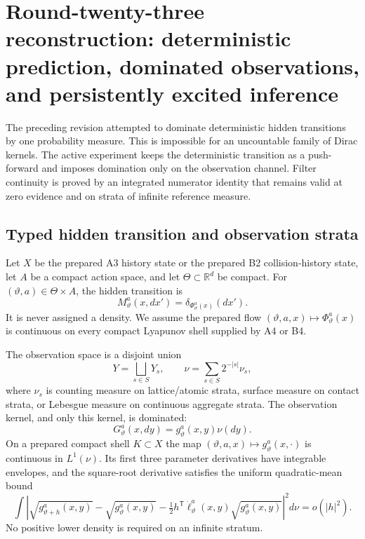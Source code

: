 \section{Round-twenty-three reconstruction: deterministic prediction, dominated observations, and persistently excited inference}
\label{sec:r23-c1}

The preceding revision attempted to dominate deterministic hidden transitions
by one probability measure.  This is impossible for an uncountable family of
Dirac kernels.  The active experiment keeps the deterministic transition as a
push-forward and imposes domination only on the observation channel.  Filter
continuity is proved by an integrated numerator identity that remains valid at
zero evidence and on strata of infinite reference measure.

\subsection{Typed hidden transition and observation strata}

Let $X$ be the prepared A3 history state or the prepared B2 collision-history
state, let $A$ be a compact action space, and let $\Theta\subset\mathbb R^d$
be compact.  For $(\vartheta,a)\in\Theta\times A$, the hidden transition is
\[
 M_\vartheta^a(x,dx')=\delta_{\Phi_\vartheta^a(x)}(dx'). \tag{C1.1}
\]
It is never assigned a density.  We assume the prepared flow
$(\vartheta,a,x)\mapsto\Phi_\vartheta^a(x)$ is continuous on every compact
Lyapunov shell supplied by A4 or B4.

The observation space is a disjoint union
\[
 Y=\bigsqcup_{s\in S}Y_s,\qquad
 \nu=\sum_{s\in S}2^{-|s|}\nu_s,                         \tag{C1.2}
\]
where $\nu_s$ is counting measure on lattice/atomic strata, surface measure on
contact strata, or Lebesgue measure on continuous aggregate strata.  The
observation kernel, and only this kernel, is dominated:
\[
 G_\vartheta^a(x,dy)=g_\vartheta^a(x,y)\nu(dy).           \tag{C1.3}
\]
On a prepared compact shell $K\subset X$ the map
$(\vartheta,a,x)\mapsto g_\vartheta^a(x,\cdot)$ is continuous in
$L^1(\nu)$.  Its first three parameter derivatives have integrable envelopes,
and the square-root derivative satisfies the uniform quadratic-mean bound
\[
 \int\left|\sqrt{g_{\vartheta+h}^a(x,y)}-\sqrt{g_\vartheta^a(x,y)}
 -\tfrac12h^\mathsf T\dot\ell_\vartheta^a(x,y)
       \sqrt{g_\vartheta^a(x,y)}\right|^2d\nu=o(|h|^2).  \tag{C1.4}
\]
No positive lower density is required on an infinite stratum.

